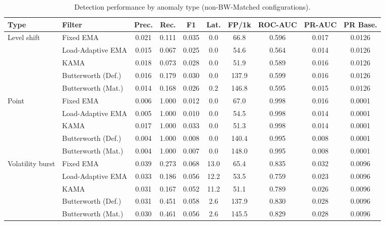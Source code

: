 \documentclass[conference]{IEEEtran}
\begin{document}
\begin{table}[t]
\centering
\caption{Detection performance by anomaly type (non-BW-Matched configurations).}
\label{tab:bytype}
\footnotesize
\begin{tabular}{llcccccccc}
\hline
\textbf{Type} & \textbf{Filter} & \textbf{Prec.} & \textbf{Rec.}
  & \textbf{F1} & \textbf{Lat.} & \textbf{FP/1k}
  & \textbf{ROC-AUC} & \textbf{PR-AUC} & \textbf{PR Base.} \\
\hline
\multirow{5}{*}{Level shift}
 & Fixed EMA           & 0.021 & 0.111 & 0.035 & 0.0 & 66.8  & 0.596 & 0.017 & 0.0126 \\
 & Load-Adaptive EMA   & 0.015 & 0.067 & 0.025 & 0.0 & 54.6  & 0.564 & 0.014 & 0.0126 \\
 & KAMA                & 0.018 & 0.073 & 0.028 & 0.0 & 51.9  & 0.589 & 0.016 & 0.0126 \\
 & Butterworth (Def.)  & 0.016 & 0.179 & 0.030 & 0.0 & 137.9 & 0.599 & 0.016 & 0.0126 \\
 & Butterworth (Mat.)  & 0.014 & 0.168 & 0.026 & 0.2 & 146.8 & 0.595 & 0.015 & 0.0126 \\
\hline
\multirow{5}{*}{Point}
 & Fixed EMA           & 0.006 & 1.000 & 0.012 & 0.0 & 67.0  & 0.998 & 0.016 & 0.0001 \\
 & Load-Adaptive EMA   & 0.005 & 1.000 & 0.010 & 0.0 & 54.5  & 0.998 & 0.014 & 0.0001 \\
 & KAMA                & 0.017 & 1.000 & 0.033 & 0.0 & 51.3  & 0.998 & 0.014 & 0.0001 \\
 & Butterworth (Def.)  & 0.004 & 1.000 & 0.008 & 0.0 & 140.4 & 0.995 & 0.008 & 0.0001 \\
 & Butterworth (Mat.)  & 0.004 & 1.000 & 0.007 & 0.0 & 148.0 & 0.995 & 0.008 & 0.0001 \\
\hline
\multirow{5}{*}{Volatility burst}
 & Fixed EMA           & 0.039 & 0.273 & 0.068 & 13.0 & 65.4  & 0.835 & 0.032 & 0.0096 \\
 & Load-Adaptive EMA   & 0.033 & 0.186 & 0.056 & 12.2 & 53.5  & 0.759 & 0.023 & 0.0096 \\
 & KAMA                & 0.031 & 0.167 & 0.052 & 11.2 & 51.1  & 0.789 & 0.026 & 0.0096 \\
 & Butterworth (Def.)  & 0.031 & 0.451 & 0.058 & 2.6  & 137.9 & 0.830 & 0.028 & 0.0096 \\
 & Butterworth (Mat.)  & 0.030 & 0.461 & 0.056 & 2.6  & 145.5 & 0.829 & 0.028 & 0.0096 \\
\hline
\end{tabular}
\end{table}
\end{document}
